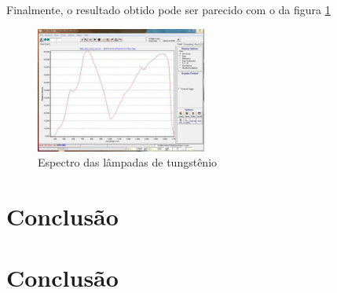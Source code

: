 \documentclass[article]{IEEEtran}
\begin{document}
Finalmente, o resultado obtido pode ser parecido com o da figura \ref{fig:resultado_espectrometro}

\begin{figure}[H]
	\includegraphics[width=0.5\textwidth]{images/resultado_espectrometro.jpg}
	\caption{Espectro das lâmpadas de tungstênio}
	\label{fig:resultado_espectrometro}
\end{figure} 

\section{Conclusão}




\section{Conclusão}
\end{document}
